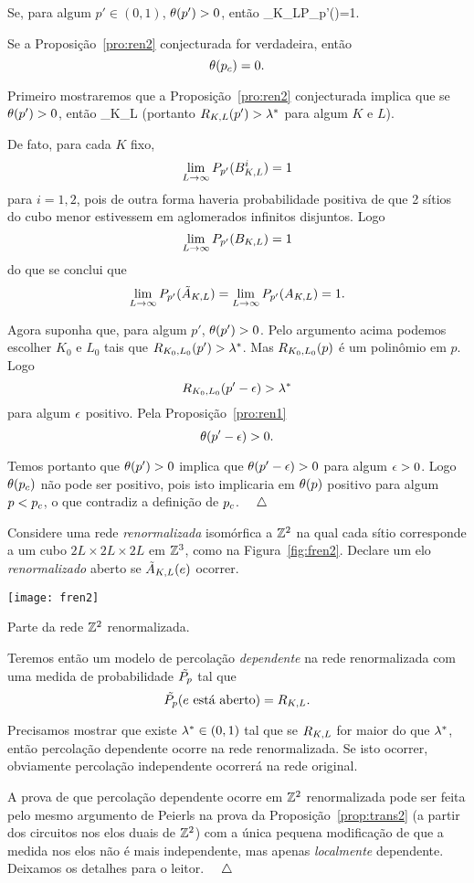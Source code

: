 \vs

\bpro[Conjectura]
\label{pro:ren2}
Se, para algum $p'\in(0,1)$, $\theta(p')>0$, então
\beq
\label{eq:ren1}
\sup_K\liminf_{L\to\infty}P_{p'}(\akl)=1.
\eeq
\epro

\vs

\bte
\label{teo:ren}
Se a Proposição~\ref{pro:ren2} conjecturada for verdadeira, então $$\theta(p_c)=0.$$
\ete


Primeiro mostraremos que a Proposição~\ref{pro:ren2} conjecturada implica que
se $\theta(p')>0$, então 
\beq
\label{eq:ren2}
\sup_K\liminf_{L\to\infty}
\eeq
(portanto $R_{K,L}(p')>\lambda^\ast$ para algum $K$ e $L$).

De fato, para cada $K$ fixo, $$\lim_{L\to\infty}P_{p'}(B_{K,L}^i)=1$$
para $i=1,2$, pois de outra forma haveria probabilidade positiva de que 2
sítios do cubo menor estivessem em aglomerados infinitos disjuntos.
Logo $$\lim_{L\to\infty}P_{p'}(B_{K,L})=1$$ do que se conclui que
$$\lim_{L\to\infty}P_{p'}(\tilde A_{K,L})=\lim_{L\to\infty}P_{p'}(A_{K,L})=1.$$

Agora suponha que, para algum $p'$, $\theta(p')>0$. Pelo argumento acima podemos
escolher $K_0$ e $L_0$ tais que $R_{K_0,L_0}(p')>\lambda^\ast$. Mas $R_{K_0,L_0}(p)$ é um polinômio em
$p$. Logo $$R_{K_0,L_0}(p'-\epsilon)>\lambda^\ast$$ para algum $\epsilon$ positivo. Pela Proposição~\ref{pro:ren1}
$$\theta(p'-\epsilon)>0.$$

Temos portanto que $\theta(p')>0$ implica que $\theta(p'-\epsilon)>0$ para algum $\epsilon>0$.
Logo $\theta(p_c)$ não pode ser positivo, pois isto implicaria em $\theta(p)$ positivo
para algum $p<p_c$, o que contradiz a definição de $p_c$. $\quad\triangle$

\vs


Considere uma rede {\em renormalizada} isomórfica a $\mathbb{Z}^2$ na qual cada sítio
corresponde a um cubo $2L\times2L\times2L$ em $\mathbb{Z}^3$, como na
Figura~\ref{fig:fren2}. Declare um elo
{\em renormalizado} aberto se $\tilde A_{K,L}(e)$ ocorrer. 

\bef
%
\texttt{[image: fren2]}
\caption{Parte da rede $\mathbb{Z}^2$ renormalizada.}
\label{fig:fren2}
\eef

Teremos então um modelo de percolação {\em dependente} na rede renormalizada
com uma medida de probabilidade $\tilde{P_p}$ tal que 
$$\tilde{P_p}(\mbox{$e$ está aberto})=R_{K,L}.$$

Precisamos mostrar que existe $\lambda^\ast\in(0,1)$ tal que se $R_{K,L}$ for maior do 
que $\lambda^\ast$, então
percolação dependente ocorre na rede renormalizada. Se isto ocorrer,
obviamente percolação independente ocorrerá na rede original.

A prova de que percolação dependente ocorre em $\mathbb{Z}^2$ renormalizada pode ser feita 
pelo mesmo argumento de Peierls na prova da Proposição~\ref{prop:trans2}
(a partir dos circuitos nos elos duais de $\mathbb{Z}^2$)
com a única pequena modificação de que a medida nos elos não é mais
independente, mas apenas {\em localmente} dependente. Deixamos os detalhes 
para o leitor. $\quad\triangle$
